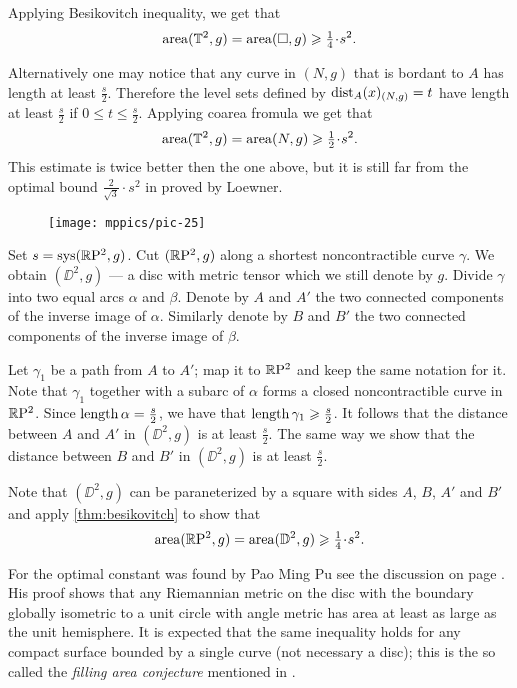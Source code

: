 Applying Besikovitch inequality, we get that 
\[\area(\TT^2,g)=\area(\square,g)\ge \tfrac14\cdot s^2.\]

Alternatively one may notice that any curve in $(N,g)$ that is bordant to $A$ has length at least $\tfrac s2$.
Therefore the level sets defined by $\mathrm{dist}_A(x)_{(N,g)}=t$ have length at least $\tfrac s2$ if $0\le t\le \tfrac s2$.
Applying coarea fromula we get that
\[\area(\TT^2,g)=\area(N,g)\ge \tfrac12\cdot s^2.\]
This estimate is twice better then the one above, but it is still far from the optimal bound $\tfrac2{\sqrt{3}}\cdot s^2$ in proved by Loewner.

\begin{wrapfigure}{r}{44 mm}
\vskip-4mm
\centering
\texttt{[image: mppics/pic-25]}
\end{wrapfigure}

Set $s\z=\sys (\RP^2,g)$.
Cut $(\mathbb{R}\mathrm{P}^2,g)$ along a shortest noncontractible curve $\gamma$.
We obtain $(\DD^2,g)$ --- a disc with metric tensor which we still denote by $g$.
Divide $\gamma$ into two equal arcs $\alpha$ and $\beta$.
Denote by $A$ and $A'$ the two connected components of the inverse image of $\alpha$.
Similarly denote by $B$ and $B'$ the two connected components of the inverse image of $\beta$.

Let $\gamma_1$ be a path from $A$ to $A'$;
map it to $\mathbb{R}\mathrm{P}^2$ and keep the same notation for it.
Note that $\gamma_1$ together with a subarc of $\alpha$ forms a closed noncontractible curve in $\mathbb{R}\mathrm{P}^2$.
Since $\mathop{\rm length}\nolimits\alpha=\tfrac s2$, we have that $\mathop{\rm length}\nolimits\gamma_1\geqslant \tfrac s2$.
It follows that the distance between $A$ and $A'$ in $(\DD^2,g)$ is at least $\tfrac s2$.
The same way we show that the distance between $B$ and $B'$ in $(\DD^2,g)$ is at least $\tfrac s2$.

Note that $(\DD^2,g)$ can be paraneterized by a square with sides $A$, $B$, $A'$ and $B'$ and apply \ref{thm:besikovitch} to show that 
\[\area(\RP^2,g)=\area(\DD^2,g)\ge \tfrac14\cdot s^2.\]

For the optimal constant was found by Pao Ming Pu see the discussion on page \pageref{page:pu}.
His proof shows that any Riemannian metric on the disc with the boundary globally isometric to a unit circle with angle metric has area at least as large as the unit hemisphere.
It is expected that the same inequality holds for any compact surface bounded by a single curve (not necessary a disc);
this is the so called the {}\emph{filling area conjecture} mentioned in \cite[5.5.B$'$(e$'$)]{gromov-1983}.

